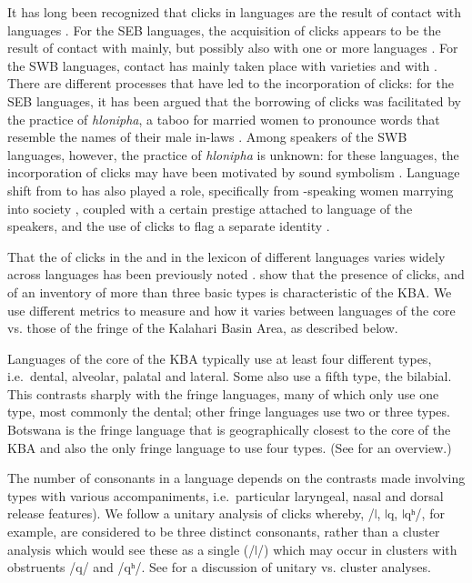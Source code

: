\documentclass[output=paper,newtxmath,modfonts,nonflat,draftmode]{langsci/langscibook}
\begin{document}
It has long been recognized that clicks in  languages are the result of contact with  languages \citep{Bleek1862}. For the SEB languages, the acquisition of clicks appears to be the result of contact with  mainly, but possibly also with one or more  languages \citep{Pakendorf2017}. For the SWB languages, contact has mainly taken place with  varieties and with  \citep{Gunnink2015}. There are different processes that have led to the incorporation of clicks: for the SEB languages, it has been argued that the borrowing of clicks was facilitated by the practice of \textit{hlonipha}, a taboo for married women to pronounce words that resemble the names of their male in-laws \citep{Herbert1990}. Among speakers of the SWB languages, however, the practice of \textit{hlonipha} is unknown: for these languages, the incorporation of clicks may have been motivated by sound symbolism \citep{BostoenSands2012}. Language shift from  to  has also played a role, specifically from -speaking women marrying into  society \citep{Pakendorf2011}, coupled with a certain prestige attached to language of the  speakers, and the use of clicks to flag a separate identity \citep{Gunnink2015}. 

That the  of clicks in the  and in the lexicon of different  languages varies widely across languages has been previously noted \citep{Güldemann2008}. \citet{naumann2015} show that the presence of clicks, and of an inventory of more than three basic  types is characteristic of the KBA. We use different metrics to measure  and how it varies between languages of the core vs. those of the fringe of the Kalahari Basin Area, as described below. 

\largerpage
Languages of the core of the KBA typically use at least four different  types, i.e.\ dental, alveolar, palatal and lateral. Some also use a fifth  type, the bilabial. This contrasts sharply with the fringe languages, many of which only use one  type, most commonly the dental; other fringe languages use two or three  types. Botswana  is the fringe language that is geographically closest to the core of the KBA and also the only fringe language to use four  types. (See  for an overview.) 

The number of  consonants in a language depends on the contrasts made involving  types with various  accompaniments, i.e.\ particular laryngeal, nasal and dorsal release features). We follow a unitary analysis of clicks whereby, /ǀ, ǀq, ǀqʰ/, for example, are considered to be three distinct consonants, rather than a cluster analysis which would see these as a single  (/ǀ/) which may occur in clusters with obstruents /q/ and /qʰ/. See \citet{Bradfield2014} for a discussion of unitary vs. cluster analyses. 
\end{document}
